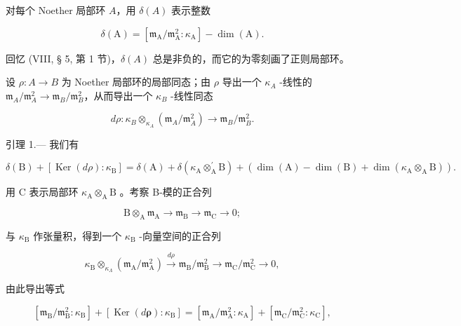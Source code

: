 对每个 Noether 局部环 \( A \)，用 \( \delta(A) \) 表示整数

\[
\delta (\mathrm{A}) = \left[ \mathfrak {m} _ {\mathrm{A}} / \mathfrak {m} _ {\mathrm{A}} ^ {2}: \kappa_ {\mathrm{A}} \right] - \dim (\mathrm{A}).
\]

回忆 (VIII, § 5, 第 1 节)，\(\delta(A)\) 总是非负的，而它的为零刻画了正则局部环。

设 \(\rho : A \to B\) 为 Noether 局部环的局部同态；由 \(\rho\) 导出一个 \(\kappa_{A}\) -线性的 \(\mathfrak{m}_{A}/\mathfrak{m}_{A}^{2} \longrightarrow \mathfrak{m}_{B}/\mathfrak{m}_{B}^{2}\)，从而导出一个 \(\kappa_{B}\) -线性同态

\[
d \rho : \kappa_ {B} \otimes_ {\kappa_ {A}} \left(\mathfrak {m} _ {A} / \mathfrak {m} _ {A} ^ {2}\right) \longrightarrow \mathfrak {m} _ {B} / \mathfrak {m} _ {B} ^ {2}.
\]

引理 1.--- 我们有

\[
\delta (\mathrm{B}) + \left[ \operatorname{Ker} (d \rho): \kappa_ {\mathrm{B}} \right] = \delta (\mathrm{A}) + \delta \left(\kappa_ {\mathrm{A}} \otimes_ {\mathrm{A}} ^ {\prime} \mathrm{B}\right) + (\dim (\mathrm{A}) - \dim (\mathrm{B}) + \dim \left(\kappa_ {\mathrm{A}} \otimes_ {\mathrm{A}} \mathrm{B}\right)).
\]

用 C 表示局部环 \(\kappa_{\mathrm{A}}\otimes_{\mathrm{A}}\mathrm{B}\) 。考察 B-模的正合列

\[
\mathrm{B} \otimes_ {\mathrm{A}} \mathfrak {m} _ {\mathrm{A}} \longrightarrow \mathfrak {m} _ {\mathrm{B}} \longrightarrow \mathfrak {m} _ {\mathrm{C}} \rightarrow 0;
\]

与 \(\kappa_{\mathrm{B}}\) 作张量积，得到一个 \(\kappa_{\mathrm{B}}\) -向量空间的正合列

\[
\kappa_ {\mathrm{B}} \otimes_ {\kappa_ {\Lambda}} (\mathfrak {m} _ {\mathrm{A}} / \mathfrak {m} _ {\mathrm{A}} ^ {2}) \stackrel {d \rho} {\longrightarrow} \mathfrak {m} _ {\mathrm{B}} / \mathfrak {m} _ {\mathrm{B}} ^ {2} \longrightarrow \mathfrak {m} _ {\mathrm{C}} / \mathfrak {m} _ {\mathrm{C}} ^ {2} \rightarrow 0,
\]

由此导出等式

\[
\left[ \mathfrak {m} _ {\mathrm{B}} / \mathfrak {m} _ {\mathrm{B}} ^ {2}: \kappa_ {\mathrm{B}} \right] + \left[ \operatorname{Ker} (d \boldsymbol {\rho}): \kappa_ {\mathrm{B}} \right] = \left[ \mathfrak {m} _ {\mathrm{A}} / \mathfrak {m} _ {\mathrm{A}} ^ {2}: \kappa_ {\mathrm{A}} \right] + \left[ \mathfrak {m} _ {\mathrm{C}} / \mathfrak {m} _ {\mathrm{C}} ^ {2}: \kappa_ {\mathrm{C}} \right],
\]

